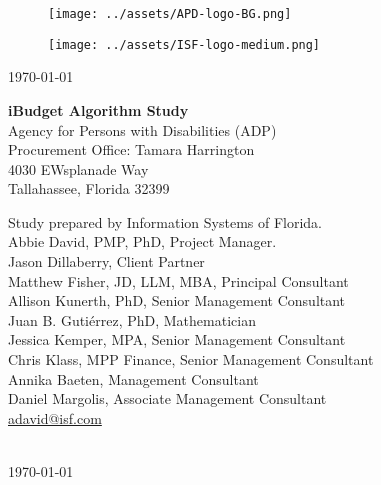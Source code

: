 \thispagestyle{empty}
\begin{center}
	{\Large \textbf{\sc{\TheTitle}} } 




	\begin{figure}[th]
		\centering
		\texttt{[image: ../assets/APD-logo-BG.png]}
	\end{figure}

	\vspace{\fill}

	\begin{figure}[th]
		\centering
		\texttt{[image: ../assets/ISF-logo-medium.png]}
	\end{figure}


	{\Large \textbf{\sc{\TheAuthor}}}

	{\normalsize \today}


	

\end{center}

\newpage
\thispagestyle{empty}

\begin{flushleft}

\phantom{ghost text}

\vspace{\fill}

\noindent \textbf{iBudget Algorithm Study} \\
Agency for Persons with Disabilities (ADP) \\
Procurement Office: Tamara Harrington \\
4030 EWsplanade Way \\
Tallahassee, Florida 32399

\vspace{1cm}

\noindent Study prepared by Information Systems of Florida. \\
Abbie David, PMP, PhD, Project Manager. \\
Jason Dillaberry, Client Partner \\
Matthew Fisher, JD, LLM, MBA, Principal Consultant \\
Allison Kunerth, PhD, Senior Management Consultant \\
Juan B. Gutiérrez, PhD, Mathematician \\
Jessica Kemper, MPA, Senior Management Consultant \\
Chris Klass, MPP Finance, Senior Management Consultant \\
Annika Baeten, Management Consultant \\
Daniel Margolis, Associate Management Consultant \\

\href{mailto:adavid@isf.com}{adavid@isf.com}

\vspace{0.5in}

\noindent \TheAuthor \\
\today
\end{flushleft}


